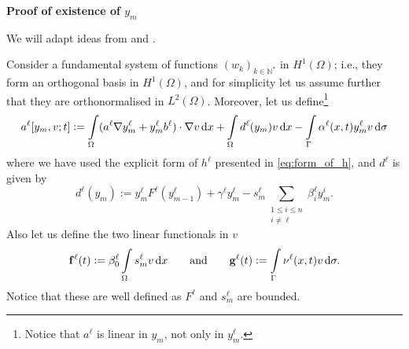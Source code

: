 \documentclass[11pt]{article}
\newcommand{\N}{\mathbb{N}}
\numberwithin{equation}{section}
\begin{document}
\vspace{1\baselineskip}
\noindent\textbf{Proof of existence of \(y_m\)}
\vspace{0.5\baselineskip}
	
	We will adapt ideas from \cite{Ladyzenskaja-1968,Troltzsch-2010} and \cite{Evans-2010}.
	
	Consider a fundamental system of functions \((w_k)_{k\in \N^*}\) in \(H^1(\Omega)\); i.e., they form an orthogonal basis in \(H^1(\Omega)\), and for simplicity let us assume further that they are orthonormalised in \(L^2(\Omega)\). Moreover, let us define\footnote{Notice that \(a^\ell\) is linear in \( y_m\), not only in \(y_m^\ell\).}
	\[
		a^\ell [ y_m,v;t] := 
		\int\limits_\Omega (a^\ell \nabla y_m^\ell + y_m^\ell b^\ell ) \cdot \nabla v \dif x + \int\limits_\Omega d^\ell (y_m) v \dif x
		- \int\limits_\Gamma \alpha^\ell (x,t) y_m^\ell v \dif \sigma
	\]
	where we have used the explicit form of \(h^\ell\) presented in \eqref{eq:form_of_h}, and \(d^\ell\) is given by
	\[
		d^\ell (y_m) := y_m^\ell F^\ell(y_{m-1}^\ell) + \gamma^\ell y_m^\ell - s_m^\ell \sum_{\substack{1\le i\le n\\ i\neq \ell}} \beta_i^\ell y_m^i.
	\]
	Also let us define the two linear functionals in \(v\)
	\[
		\mathbf{f}^\ell (t) := \beta_0^\ell \int\limits_\Omega s_m^\ell  v \dif x
		\qquad\text{and}\qquad
		\mathbf{g}^\ell (t) :=  \int\limits_\Gamma \nu^\ell (x,t)  v \dif \sigma.
	\]
	Notice that these are well defined as \(F^\ell\) and \(s_m^\ell\) are bounded.
	
	
	
	
	
\end{document}
